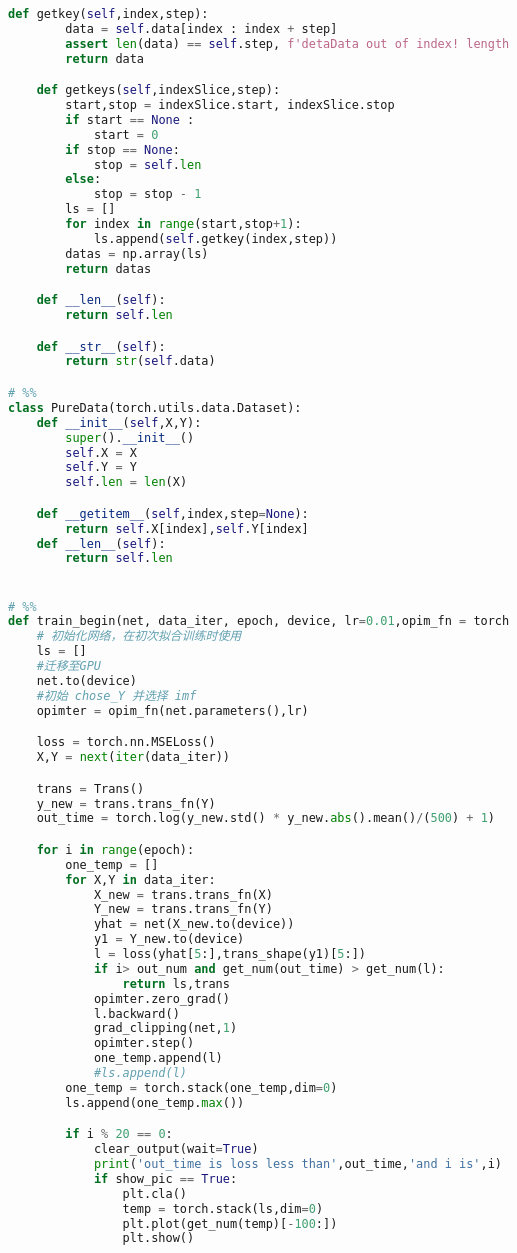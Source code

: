 \begin{appendices}
\begin{lstlisting}[language=python]
    def getkey(self,index,step):
        data = self.data[index : index + step]
        assert len(data) == self.step, f'detaData out of index! length is {self.len} but index is {index}'
        return data

    def getkeys(self,indexSlice,step):
        start,stop = indexSlice.start, indexSlice.stop
        if start == None :
            start = 0
        if stop == None:
            stop = self.len
        else:
            stop = stop - 1
        ls = []
        for index in range(start,stop+1):
            ls.append(self.getkey(index,step))
        datas = np.array(ls)
        return datas

    def __len__(self):
        return self.len

    def __str__(self):
        return str(self.data)

# %%
class PureData(torch.utils.data.Dataset):
    def __init__(self,X,Y):
        super().__init__()
        self.X = X
        self.Y = Y
        self.len = len(X)

    def __getitem__(self,index,step=None):
        return self.X[index],self.Y[index]
    def __len__(self):
        return self.len


# %%
def train_begin(net, data_iter, epoch, device, lr=0.01,opim_fn = torch.optim.Adam,out_num = 1000, show_pic = True):
    # 初始化网络，在初次拟合训练时使用
    ls = []
    #迁移至GPU
    net.to(device)
    #初始 chose_Y 并选择 imf
    opimter = opim_fn(net.parameters(),lr)

    loss = torch.nn.MSELoss()
    X,Y = next(iter(data_iter))

    trans = Trans()
    y_new = trans.trans_fn(Y)
    out_time = torch.log(y_new.std() * y_new.abs().mean()/(500) + 1)

    for i in range(epoch):
        one_temp = []
        for X,Y in data_iter:
            X_new = trans.trans_fn(X)
            Y_new = trans.trans_fn(Y)
            yhat = net(X_new.to(device))
            y1 = Y_new.to(device)
            l = loss(yhat[5:],trans_shape(y1)[5:])
            if i> out_num and get_num(out_time) > get_num(l):
                return ls,trans
            opimter.zero_grad()
            l.backward()
            grad_clipping(net,1)
            opimter.step()
            one_temp.append(l)
            #ls.append(l)
        one_temp = torch.stack(one_temp,dim=0)
        ls.append(one_temp.max())

        if i % 20 == 0:
            clear_output(wait=True)
            print('out_time is loss less than',out_time,'and i is',i)
            if show_pic == True:
                plt.cla()
                temp = torch.stack(ls,dim=0)
                plt.plot(get_num(temp)[-100:])
                plt.show()


\end{lstlisting}
\end{appendices}
